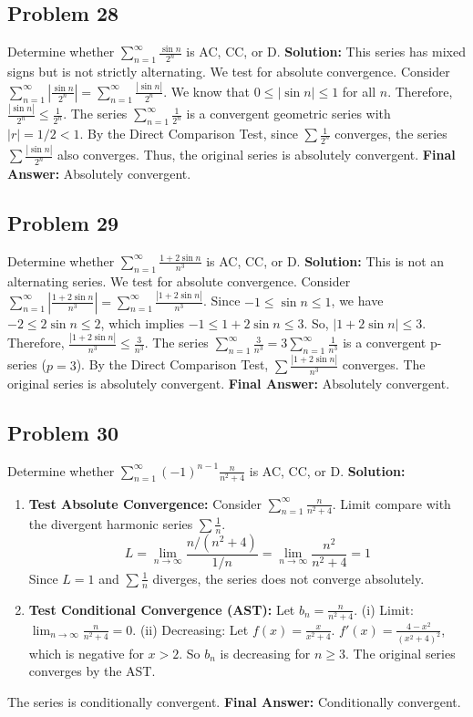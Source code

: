 \documentclass{article}
\begin{document}
\subsection*{Problem 28}
Determine whether $\sum_{n=1}^{\infty} \frac{\sin n}{2^n}$ is AC, CC, or D.
\textbf{Solution:} This series has mixed signs but is not strictly alternating. We test for absolute convergence.
Consider $\sum_{n=1}^{\infty} \left| \frac{\sin n}{2^n} \right| = \sum_{n=1}^{\infty} \frac{|\sin n|}{2^n}$.
We know that $0 \le |\sin n| \le 1$ for all $n$. Therefore, $\frac{|\sin n|}{2^n} \le \frac{1}{2^n}$.
The series $\sum_{n=1}^{\infty} \frac{1}{2^n}$ is a convergent geometric series with $|r|=1/2 < 1$.
By the Direct Comparison Test, since $\sum \frac{1}{2^n}$ converges, the series $\sum \frac{|\sin n|}{2^n}$ also converges.
Thus, the original series is absolutely convergent.
\textbf{Final Answer:} Absolutely convergent.

\subsection*{Problem 29}
Determine whether $\sum_{n=1}^{\infty} \frac{1+2\sin n}{n^3}$ is AC, CC, or D.
\textbf{Solution:} This is not an alternating series. We test for absolute convergence. Consider $\sum_{n=1}^{\infty} \left| \frac{1+2\sin n}{n^3} \right| = \sum_{n=1}^{\infty} \frac{|1+2\sin n|}{n^3}$.
Since $-1 \le \sin n \le 1$, we have $-2 \le 2\sin n \le 2$, which implies $-1 \le 1+2\sin n \le 3$.
So, $|1+2\sin n| \le 3$.
Therefore, $\frac{|1+2\sin n|}{n^3} \le \frac{3}{n^3}$.
The series $\sum_{n=1}^{\infty} \frac{3}{n^3} = 3 \sum_{n=1}^{\infty} \frac{1}{n^3}$ is a convergent p-series ($p=3$).
By the Direct Comparison Test, $\sum \frac{|1+2\sin n|}{n^3}$ converges.
The original series is absolutely convergent.
\textbf{Final Answer:} Absolutely convergent.

\subsection*{Problem 30}
Determine whether $\sum_{n=1}^{\infty} (-1)^{n-1} \frac{n}{n^2+4}$ is AC, CC, or D.
\textbf{Solution:}
\begin{enumerate}
    \item \textbf{Test Absolute Convergence:} Consider $\sum_{n=1}^{\infty} \frac{n}{n^2+4}$. Limit compare with the divergent harmonic series $\sum \frac{1}{n}$.
    \[ L = \lim_{n \to \infty} \frac{n/(n^2+4)}{1/n} = \lim_{n \to \infty} \frac{n^2}{n^2+4} = 1 \]
    Since $L=1$ and $\sum \frac{1}{n}$ diverges, the series does not converge absolutely.
    \item \textbf{Test Conditional Convergence (AST):} Let $b_n = \frac{n}{n^2+4}$.
    (i) Limit: $\lim_{n \to \infty} \frac{n}{n^2+4} = 0$.
    (ii) Decreasing: Let $f(x) = \frac{x}{x^2+4}$. $f'(x) = \frac{4-x^2}{(x^2+4)^2}$, which is negative for $x>2$. So $b_n$ is decreasing for $n \ge 3$.
    The original series converges by the AST.
\end{enumerate}
The series is conditionally convergent.
\textbf{Final Answer:} Conditionally convergent.
\end{document}
